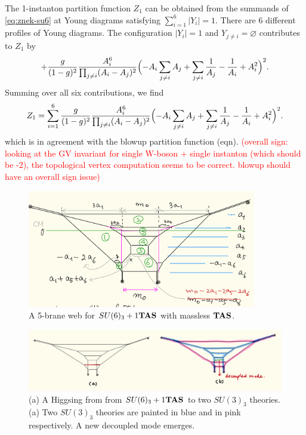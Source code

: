 \documentclass[letterpaper, 11pt]{article}
\begin{document}
The 1-instanton partition function $Z_1$ can be obtained from the summands of \eqref{eq:znek-su6} at Young diagrams satisfying $\sum_{i=1}^6 |Y_i|=1$. There are 6 different profiles of Young diagrams. The configuration $|Y_i| = 1$ and $Y_{j\neq i} = \varnothing$ contributes to $Z_{1}$ by
\begin{align}
  + \frac{g}{(1-g)^2} \frac{A_i^6}{\prod_{j \neq i} (A_i - A_j)^2} 
  \Bigl(-A_i \sum_{j\neq i} A_j +  \sum_{j\neq i}\frac{1}{A_j}  - \frac{1}{A_i} + A_i^2
 \Bigr)^2. 
\end{align}
Summing over all six contributions, we find
\begin{align}
  Z_1 = \sum_{i=1}^6 \frac{g}{(1-g)^2} \frac{A_i^6}{\prod_{j \neq i} (A_i - A_j)^2} 
  \Bigl(-A_i \sum_{j\neq i} A_j +  \sum_{j\neq i}\frac{1}{A_j}  - \frac{1}{A_i} + A_i^2
 \Bigr)^2. 
\end{align}
which is in agreement with the blowup partition function (eqn). \textcolor{red}{(overall sign: looking at the GV invariant for single W-boson + single instanton (which should be -2), the topological vertex computation seems to be correct. blowup should have an overall sign issue)}
\pagebreak

\begin{figure}[t]
\centering
\includegraphics[width=10cm]{SU6-monopole.jpeg}
\caption{A 5-brane web for $SU(6)_3+1{\bf TAS}$ with massless ${\bf TAS}$.}
\label{fig:SU6-monopole}
\end{figure}

\begin{figure}[t]
\centering
\includegraphics[width=12cm]{SU6-Higgsing.jpeg}
\caption{(a) A Higgsing from from $SU(6)_3+1{\bf TAS}$ to two $SU(3)_3$ theories. (a) Two $SU(3)_3$ theories are painted in blue and in pink respectively. A new decoupled mode emerges.}
\label{fig:SU6-Higgsing}
\end{figure}
\end{document}
